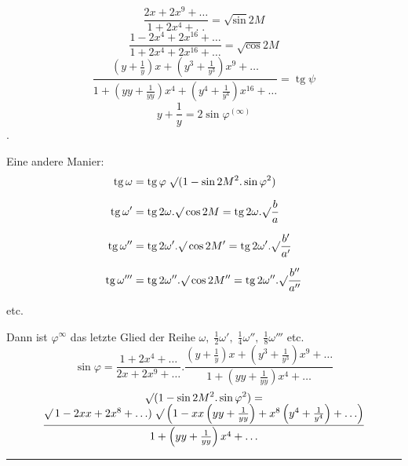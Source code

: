 \[\frac{2x+2x^9+\ldots}{1+2x^4+\mathord{.}\;\mathord{.}}=\surd\sin2M\]
\[\frac{1-2x^4+2x^{16}+\ldots}{1+2x^4+2x^{16}+\ldots}=\surd\cos2M\]
\[\frac{\left(y+\frac1y\right)x+\left(y^3+\frac1{y^3}\right)x^9+\ldots}{1+\left(yy+\frac1{yy}\right)x^4+\left(y^4+\frac1{y^4}\right)x^{16}+\ldots}=\operatorname{tg}\psi\]
\begin{equation*}\tag*{[7]}y+\frac1y=2\sin\varphi^{(\infty)}\end{equation*}
.
\noindent [S.\ 40]
\par\indent Eine andere Manier:
\[\begin{aligned}
\operatorname{tg}\omega&=\operatorname{tg}\varphi\;\surd(1-\sin2M^2.\sin\varphi^2)\\[.6em]
\operatorname{tg}\omega'&=\operatorname{tg}2\omega.\surd\cos2M=\operatorname{tg}2\omega.\surd\frac ba\\[.6em]
\operatorname{tg}\omega''&=\operatorname{tg}2\omega'.\surd\cos2M'=\operatorname{tg}2\omega'.\surd\frac{b'}{a'}\\[.6em]
\operatorname{tg}\omega'''&=\operatorname{tg}2\omega''.\surd\cos2M''=\operatorname{tg}2\omega''.\surd\frac{b''}{a''}
\end{aligned}\]
\begin{center}etc.\end{center}
\noindent Dann ist \(\varphi^\infty\) das letzte Glied der Reihe \(\omega,\;\frac12\omega',\;\frac14\omega'',\;\frac18\omega'''\) etc.
\clearpage{}
{\small
\begin{equation*}\tag*{[8]}
\sin\varphi=\frac{1+2x^4+\ldots}{2x+2x^9+\ldots}.
\frac{\left(y+\frac1y\right)x+\left(y^3+\frac1{y^3}\right)x^9+\ldots}{1+\left(yy+\frac1{yy}\right)x^4+\ldots}
\end{equation*}
\[\begin{gathered}
\surd(1-\sin2M^2.\sin\varphi^2)=\\[-.5em]
\frac{\surd\,1-2xx+2x^8+\ldots)\;\surd\left(1-xx\left(yy+\frac1{yy}\right)+x^8\left(y^4+\frac1{y^4}\right)+\ldots\right)}{1+\left(yy+\frac1{yy}\right)x^4+\ldots}
\end{gathered}\]}
\par\medskip\noindent\rule{.25\linewidth}{.4pt}
\par\smallskip{}\]
\ClosingRule
\clearpage\endgroup
